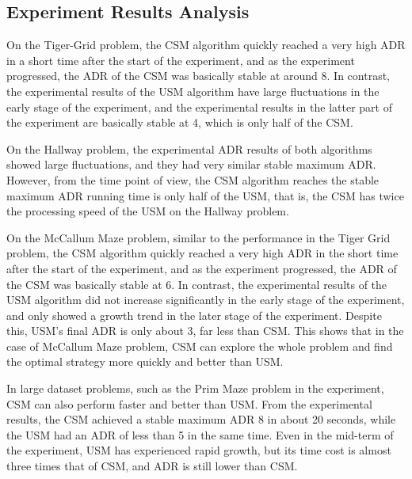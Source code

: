 \documentclass{article}
\begin{document}
\subsection{Experiment Results Analysis}

On the Tiger-Grid problem, the CSM algorithm quickly reached a very high ADR in a short
time after the start of the experiment, and as the experiment progressed, the ADR of the
CSM was basically stable at around 8. In contrast, the experimental results of the USM
algorithm have large fluctuations in the early stage of the experiment, and the
experimental results in the latter part of the experiment are basically stable at 4, which
is only half of the CSM.

On the Hallway problem, the experimental ADR results of both algorithms showed large fluctuations, 
and they had very similar stable maximum ADR. However, from the time point of view, the CSM 
algorithm reaches the stable maximum ADR running time is only half of the USM, that is, the CSM 
has twice the processing speed of the USM on the Hallway problem.


On the McCallum Maze problem, similar to the performance in the Tiger Grid
problem, the CSM algorithm quickly reached a very high ADR in the short time after
the start of the experiment, and as the experiment progressed, the ADR of the CSM
was basically stable at 6. In contrast, the experimental results of the USM algorithm
did not increase significantly in the early stage of the experiment, and only showed
a growth trend in the later stage of the experiment. Despite this, USM's final ADR
is only about 3, far less than CSM. This shows that in the case of McCallum Maze problem, 
CSM can explore the whole problem and find the optimal strategy more quickly and better than USM.

In large dataset problems, such as the Prim Maze problem in the experiment, CSM can also perform 
faster and better than USM. From the experimental results, the CSM achieved a stable maximum ADR 8 
in about 20 seconds, while the USM had an ADR of less than 5 in the same time. Even in the mid-term 
of the experiment, USM has experienced rapid growth, but its time cost is almost three times that of 
CSM, and ADR is still lower than CSM.
\end{document}
